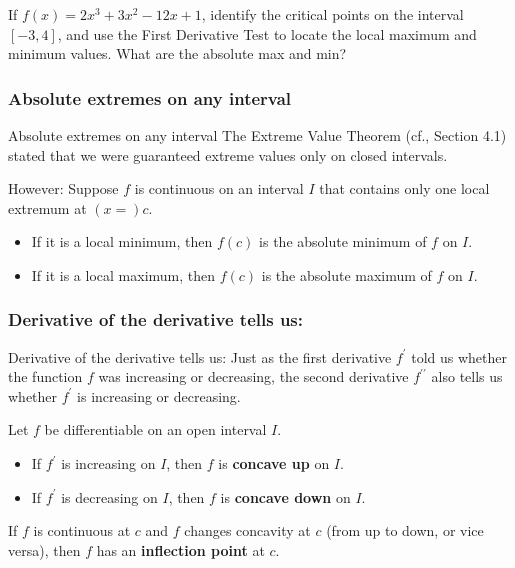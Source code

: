 \documentclass[cal1spr16Lectures.tex]{subfiles}
\begin{document}
\begin{frame}%
\frametitle{}
\begin{exe} If $f(x)=2x^3+3x^2-12x+1$, identify the critical points on the interval $[-3,4]$, and use the First Derivative Test to locate the local maximum and minimum values.  What are the absolute max and min? \end{exe}
\end{frame}

\subsubsection{Absolute extremes on any interval}

\begin{frame}{\small Absolute extremes on any interval}
\small
The Extreme Value Theorem (cf., Section 4.1) stated that we were guaranteed extreme values \alert{only on closed intervals}.  

\vspace{0.5pc}
\alert{However:}  Suppose $f$ is continuous on an interval $I$ that contains only one local extremum at $(x=)c$.

\begin{itemize}
\item If it is a local minimum, then $f(c)$ \alert{is} the absolute minimum of $f$ on $I$.

\vspace{0.5pc}
\item If it is a local maximum, then $f(c)$ \alert{is} the absolute maximum of $f$ on $I$.
\end{itemize}
\end{frame}

\subsubsection{Derivative of the derivative tells us:}

\begin{frame}{\small Derivative of the derivative tells us:}
\small 
Just as the first derivative $f^{\prime}$ told us whether the function $f$ was increasing or decreasing, the second derivative $f^{\prime\prime}$ also tells us whether $f^{\prime}$ is increasing or decreasing.

\begin{dfn} Let $f$ be differentiable on an open interval $I$.
\begin{itemize}
\item If $f^{\prime}$ is increasing on $I$, then $f$ is {\bf concave up} on $I$.
\item If $f^{\prime}$ is decreasing on $I$, then $f$ is {\bf concave down} on $I$.
\end{itemize}
\end{dfn}

\begin{dfn} If $f$ is continuous at $c$ and $f$ changes concavity at $c$ (from up to down, or vice versa), then $f$ has an {\bf inflection point} at $c$. \end{dfn}
\end{frame}
\end{document}
